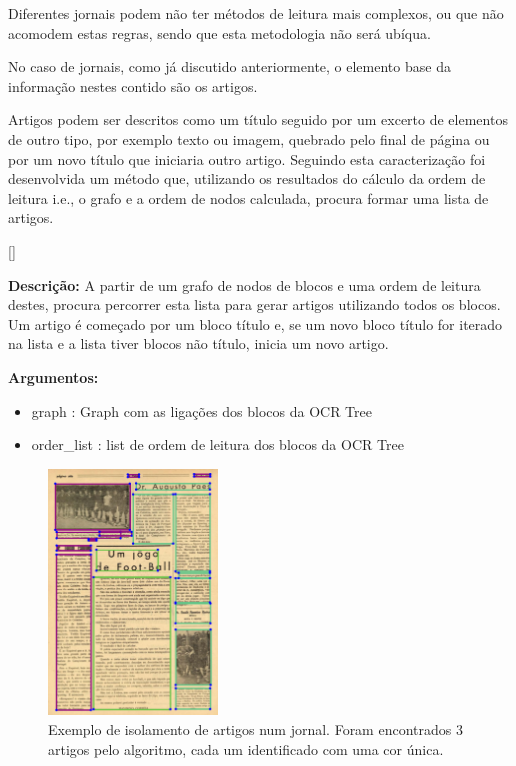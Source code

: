 Diferentes jornais podem não ter métodos de leitura mais complexos, ou que não acomodem estas regras, sendo que esta metodologia não será ubíqua. 



\label{contribution_result_segmentation}

No caso de jornais, como já discutido anteriormente, o elemento base da informação nestes contido são os artigos. 

Artigos podem ser descritos como um título seguido por um excerto de elementos de outro tipo, por exemplo texto ou imagem, quebrado pelo final de página ou por um novo título que iniciaria outro artigo. Seguindo esta caracterização foi desenvolvida um método que, utilizando os resultados do cálculo da ordem de leitura i.e., o grafo e a ordem de nodos calculada, procura formar uma lista de artigos.

[\normalsize]

\textbf{Descrição:} A partir de um grafo de nodos de blocos e uma ordem de leitura destes, procura percorrer esta lista para gerar artigos utilizando todos os blocos. Um artigo é começado por um bloco título e, se um novo bloco título for iterado na lista e a lista tiver blocos não título, inicia um novo artigo.

\textbf{Argumentos:}
\begin{itemize}\setlength\itemsep{-0.3em}
	\item graph : Graph com as ligações dos blocos da OCR Tree
	\item order\_list : list de ordem de leitura dos blocos da OCR Tree
\end{itemize}


\begin{figure}[H]
	\centering
	\includegraphics[width=0.4\textwidth]{images/ilustracoes/extract_articles_example.png}
	\caption{Exemplo de isolamento de artigos num jornal. Foram encontrados 3 artigos pelo algoritmo, cada um identificado com uma cor única.}
	\label{fig:extract_articles_example}
\end{figure}

